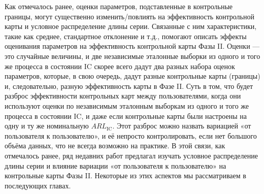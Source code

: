 Как отмечалось ранее, оценки параметров, подставленные в контрольные границы, могут существенно изменить/повлиять на эффективность контрольной карты и условное распределение длины серии. Связанные с ним характеристики, такие как среднее, стандартное отклонение и т.д., помогают описать эффекты оценивания параметров на эффективность контрольной карты Фазы II. Оценки — это случайные величины, и две независимые эталонные выборки из одного и того же процесса в состоянии IC скорее всего дадут два разных набора оценок параметров, которые, в свою очередь, дадут разные контрольные карты (границы) и, следовательно, разную эффективность карты в Фазе II. Суть в том, что будет разброс эффективности контрольных карт между пользователями, когда они используют оценки по независимым эталонным выборкам из одного и того же процесса в состоянии IC, и даже если контрольные карты были настроены на одну и ту же номинальную \(ARL_{\text{IC}}\). Этот разброс можно назвать вариацией «от пользователя к пользователю», и её непросто контролировать, если нет большого объёма данных, что не всегда возможно на практике. В этой связи, как отмечалось ранее, ряд недавних работ предлагал изучать условное распределение длины серии и влияние вариации «от пользователя к пользователю» на контрольные карты Фазы II. Некоторые из этих аспектов мы рассматриваем в последующих главах.

